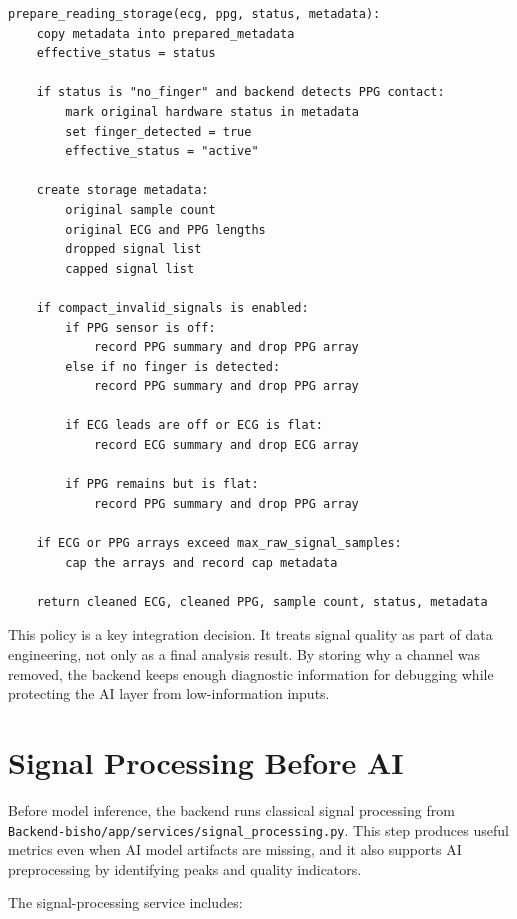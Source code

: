 \begin{lstlisting}[caption={Pseudocode for reading storage preparation}]
prepare_reading_storage(ecg, ppg, status, metadata):
    copy metadata into prepared_metadata
    effective_status = status

    if status is "no_finger" and backend detects PPG contact:
        mark original hardware status in metadata
        set finger_detected = true
        effective_status = "active"

    create storage metadata:
        original sample count
        original ECG and PPG lengths
        dropped signal list
        capped signal list

    if compact_invalid_signals is enabled:
        if PPG sensor is off:
            record PPG summary and drop PPG array
        else if no finger is detected:
            record PPG summary and drop PPG array

        if ECG leads are off or ECG is flat:
            record ECG summary and drop ECG array

        if PPG remains but is flat:
            record PPG summary and drop PPG array

    if ECG or PPG arrays exceed max_raw_signal_samples:
        cap the arrays and record cap metadata

    return cleaned ECG, cleaned PPG, sample count, status, metadata
\end{lstlisting}

This policy is a key integration decision. It treats signal quality as part of data engineering, not only as a final analysis result. By storing why a channel was removed, the backend keeps enough diagnostic information for debugging while protecting the AI layer from low-information inputs.

\section{Signal Processing Before AI}

Before model inference, the backend runs classical signal processing from \texttt{Backend-bisho/app/services/signal\_processing.py}. This step produces useful metrics even when AI model artifacts are missing, and it also supports AI preprocessing by identifying peaks and quality indicators.

The signal-processing service includes:

